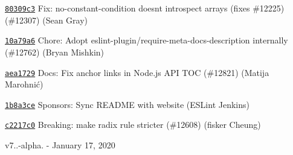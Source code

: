 \begin{DoxyItemize}
\item \href{https://github.com/eslint/eslint/commit/80309c3791188ac5d1c4eebc99ede323a55336e6}{\texttt{ {\ttfamily 80309c3}}} Fix\+: no-\/constant-\/condition doesn\textquotesingle{}t introspect arrays (fixes \#12225) (\#12307) (Sean Gray)
\item \href{https://github.com/eslint/eslint/commit/10a79a672b42d51539bcd6ace482be7afa5f34f8}{\texttt{ {\ttfamily 10a79a6}}} Chore\+: Adopt {\ttfamily eslint-\/plugin/require-\/meta-\/docs-\/description} internally (\#12762) (Bryan Mishkin)
\item \href{https://github.com/eslint/eslint/commit/aea172998ec4e2af1d9186b6767c3f34428945f4}{\texttt{ {\ttfamily aea1729}}} Docs\+: Fix anchor links in Node.\+js API TOC (\#12821) (Matija Marohnić)
\item \href{https://github.com/eslint/eslint/commit/1b8a3ce15237b9085f2761dcf73655207e6169a6}{\texttt{ {\ttfamily 1b8a3ce}}} Sponsors\+: Sync README with website (ESLint Jenkins)
\item \href{https://github.com/eslint/eslint/commit/c2217c04d6c82b160a21b00fca39c8acec543403}{\texttt{ {\ttfamily c2217c0}}} Breaking\+: make {\ttfamily radix} rule stricter (\#12608) (fisker Cheung)
\end{DoxyItemize}

v7..-\/alpha. -\/ January 17, 2020


